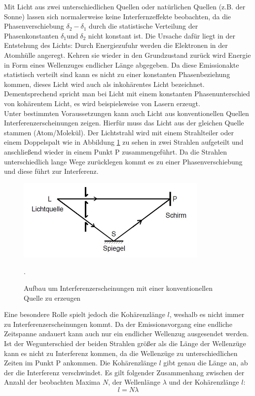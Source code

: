 Mit Licht aus zwei unterschiedlichen Quellen oder natürlichen Quellen (z.B. der Sonne)
lassen sich normalerweise keine Interfernzeffekte beobachten, da die Phasenverschiebung $\delta_{2}-\delta_{1}$ durch
die statistische Verteilung der Phasenkonstanten $\delta_{1} \text{und} \; \delta_{2}$ nicht konstant ist.
Die Ursache dafür liegt in der Entstehung des Lichts: Durch Energiezufuhr werden die Elektronen
in der Atomhülle angeregt. Kehren sie wieder in den Grundzustand zurück wird Energie in
Form eines Wellenzuges endlicher Länge abgegeben. Da diese Emissionakte statistisch verteilt sind kann es nicht zu einer
konstanten Phasenbeziehung kommen, dieses Licht wird auch als inkohärentes Licht bezeichnet.
Dementsprechend spricht man bei Licht mit einem konstanten Phasenunterschied von
kohärentem Licht, es wird beispielsweise von Lasern erzeugt.\\

Unter bestimmten Voraussetzungen kann auch Licht aus konventionellen Quellen Interferenzerscheinungen zeigen.
Hierfür muss das Licht aus der gleichen Quelle stammen (Atom/Molekül). Der Lichtstrahl wird
mit einem Strahlteiler oder einem Doppelspalt wie in Abbildung \ref{fig:doppel} zu sehen
in zwei Strahlen aufgeteilt und anschließend wieder in einem Punkt P
zusammengeführt. Da die Strahlen unterschiedlich lange Wege zurücklegen kommt es zu einer
Phasenverschiebung und diese führt zur Interferenz.

\begin{figure}[H]
  \centering
  \includegraphics[height=4cm]{Unbenannt.JPG}
  \caption{Aufbau um Interferenzerscheinungen mit einer konventionellen Quelle zu erzeugen}
  \label{fig:doppel}
  \cite{skript}.
\end{figure}

Eine besondere Rolle spielt jedoch die Kohärenzlänge $l$, weshalb es nicht immer zu
Interferenzerscheinungen kommt. Da der Emissionsvorgang eine endliche Zeitspanne andauert
kann auch nur ein endlicher Wellenzug ausgesendet werden. Ist der Wegunterschied der beiden Strahlen größer
als die Länge der Wellenzüge kann es nicht zu Interferenz kommen, da die Wellenzüge zu
unterschiedlichen Zeiten im Punkt P ankommen. Die Kohärenzlänge $l$ gibt genau die Länge an, ab der
die Interferenz verschwindet.
Es gilt folgender Zusammenhang zwischen der Anzahl der beobachten Maxima $N$, der
Wellenlänge $\lambda$ und der Kohärenzlänge $l$:
\begin{equation}
  l=N\lambda
\end{equation}


